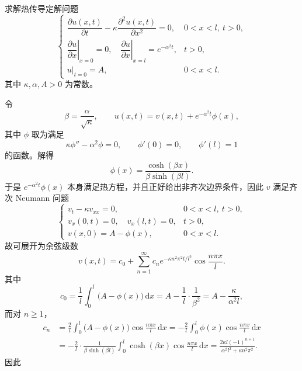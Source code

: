 \begin{question}[第2题]

求解热传导定解问题
\[
\begin{cases}
\dfrac{\partial u(x, t)}{\partial t}-\kappa \dfrac{\partial^{2} u(x, t)}{\partial x^{2}}=0, & 0<x<l,\ t>0,\\
\left.\dfrac{\partial u}{\partial x}\right|_{x=0}=0,\quad \left.\dfrac{\partial u}{\partial x}\right|_{x=l}=e^{-\alpha^{2} t}, & t>0,\\
\left.u\right|_{t=0}=A, & 0<x<l.
\end{cases}
\]
其中 $\kappa,\alpha,A>0$ 为常数。

\begin{solution}

令
\[
\beta=\frac{\alpha}{\sqrt{\kappa}},\qquad
u(x,t)=v(x,t)+e^{-\alpha^2 t}\phi(x),
\]
其中 $\phi$ 取为满足
\[
\kappa\phi''-\alpha^2\phi=0,\qquad \phi'(0)=0,\qquad \phi'(l)=1
\]
的函数。解得
\[
\phi(x)=\frac{\cosh(\beta x)}{\beta\sinh(\beta l)}.
\]
于是 $e^{-\alpha^2 t}\phi(x)$ 本身满足热方程，并且正好给出非齐次边界条件，因此 $v$ 满足齐次 Neumann 问题
\[
\begin{cases}
 v_t-\kappa v_{xx}=0, & 0<x<l,\ t>0,\\
 v_x(0,t)=0,\quad v_x(l,t)=0, & t>0,\\
 v(x,0)=A-\phi(x), & 0<x<l.
\end{cases}
\]
故可展开为余弦级数
\[
v(x,t)=c_0+\sum_{n=1}^{\infty}c_n e^{-\kappa n^2\pi^2 t/l^2}\cos\frac{n\pi x}{l}.
\]
其中
\[
c_0=\frac1l\int_0^l\bigl(A-\phi(x)\bigr)\,\mathrm dx
=A-\frac1l\cdot\frac{1}{\beta^2}
=A-\frac{\kappa}{\alpha^2 l},
\]
而对 $n\ge 1$，
\[
\begin{aligned}
c_n
&=\frac{2}{l}\int_0^l\bigl(A-\phi(x)\bigr)\cos\frac{n\pi x}{l}\,\mathrm dx
=-\frac{2}{l}\int_0^l\phi(x)\cos\frac{n\pi x}{l}\,\mathrm dx\\
&=-\frac{2}{l}\cdot\frac{1}{\beta\sinh(\beta l)}
\int_0^l \cosh(\beta x)\cos\frac{n\pi x}{l}\,\mathrm dx
=\frac{2\kappa l(-1)^{n+1}}{\alpha^2 l^2+\kappa n^2\pi^2}.
\end{aligned}
\]
因此

\end{solution}
\end{question}

